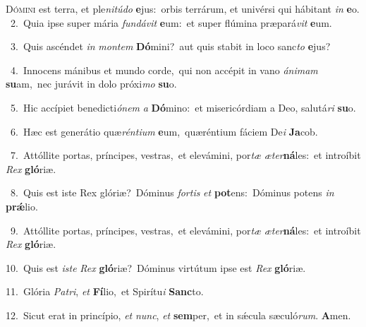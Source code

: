 \lettrine{\initial\textcolor{\initialcolor}{D}}{ómini} est terra, et ple\-\textit{ni}\-\textit{tú}\textit{do} \textbf{e}\-jus:~\star orbis terrárum, et univérsi qui hábitant \textit{in} \textbf{e}\-o.\\
{\numbfont\textcolor{\numbcolor}{~2.}}~Quia ipse super mária \textit{fun}\-\textit{dá}\textit{vit} \textbf{e}\-um:~\star et super flúmina præpará\textit{vit} \textbf{e}\-um.\par
{\numbfont\textcolor{\numbcolor}{~3.}}~Quis ascéndet \textit{in} \textit{mon}\-\textit{tem} \textbf{Dó}\-mini?~\star aut quis stabit in loco sanc\textit{to} \textbf{e}\-jus?\par
{\numbfont\textcolor{\numbcolor}{~4.}}~Innocens mánibus et mundo corde,~\dagger qui non accépit in vano \textit{á}\-\textit{ni}\textit{mam} \textbf{su}\-am,~\star nec jurávit in dolo próxi\textit{mo} \textbf{su}\-o.\par
{\numbfont\textcolor{\numbcolor}{~5.}}~Hic accípiet benedicti\-\textit{ó}\-\textit{nem} \textit{a} \textbf{Dó}\-mino:~\star et misericórdiam a Deo, salutá\textit{ri} \textbf{su}\-o.\par
{\numbfont\textcolor{\numbcolor}{~6.}}~Hæc est generátio quæ\-\textit{rén}\-\textit{ti}\textit{um} \textbf{e}\-um,~\star quæréntium fáciem De\textit{i} \textbf{Ja}\-cob.\par
{\numbfont\textcolor{\numbcolor}{~7.}}~Attóllite portas, príncipes, vestras,~\dagger et elevámini, por\textit{tæ} \textit{æ}\-\textit{ter}\textbf{ná}les:~\star et introíbit \textit{Rex} \textbf{gló}\-riæ.\par
{\numbfont\textcolor{\numbcolor}{~8.}}~Quis est iste Rex glóriæ?~\dagger Dóminus \textit{for}\-\textit{tis} \textit{et} \textbf{pot}\-ens:~\star Dóminus potens \textit{in} \textbf{prǽ}\-lio.\par
{\numbfont\textcolor{\numbcolor}{~9.}}~Attóllite portas, príncipes, vestras,~\dagger et elevámini, por\textit{tæ} \textit{æ}\-\textit{ter}\textbf{ná}les:~\star et introíbit \textit{Rex} \textbf{gló}\-riæ.\par
{\numbfont\textcolor{\numbcolor}{10.}}~Quis est \textit{is}\-\textit{te} \textit{Rex} \textbf{gló}\-riæ?~\star Dóminus virtútum ipse est \textit{Rex} \textbf{gló}\-riæ.\par
{\numbfont\textcolor{\numbcolor}{11.}}~Glória \textit{Pa}\-\textit{tri}, \textit{et} \textbf{Fí}\-lio,~\star et Spirítu\textit{i} \textbf{Sanc}\-to.\par
{\numbfont\textcolor{\numbcolor}{12.}}~Sicut erat in princípio, \textit{et} \textit{nunc}\-, \textit{et} \textbf{sem}\-per,~\star et in sǽcula sæculó\-\textit{rum}\-. \textbf{A}\-men.\par
